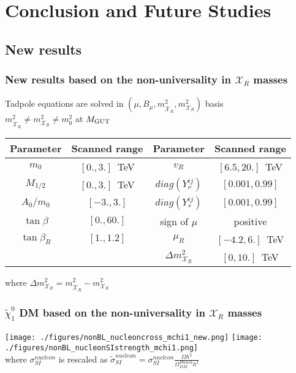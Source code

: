 \documentclass[hyperref={bookmarks=false},aspectratio=169]{beamer}
\def\singR{\mathcal{X}_{R}}
\def\singRbar{\mathcal{\overline{X}}_{R}}
\begin{document}

\section{Conclusion and Future Studies}

\subsection{New results}


\begin{frame}
\frametitle{New results based on the non-universality in $\singR$ masses}

\color{red}
\centering
Tadpole equations are solved in 
$(\mu, B_\mu, m_{\singRbar}^2, m_{\singR}^2 )$ basis \\
$m_{\singRbar}^2 \neq m_{\singR}^2 \neq m_0^2$ at $M_{\rm GUT}$ 
\pause
\begin{table}
	\color{black}
	\setlength\tabcolsep{7pt}
	\renewcommand{\arraystretch}{1.4}
	\begin{tabular}{c|c||c|c}
		Parameter      & Scanned range& Parameter      & Scanned range\\
		\hline
		$m_0$          & $[0., 3.]$~TeV   & $v_{R}$               & $[6.5, 20.]$~TeV\\
		$M_{1/2}$      & $[0., 3.]$~TeV   & $diag(Y_{\nu}^{ij})$  & $[0.001, 0.99]$\\
		$A_0/m_0$      & $[-3., 3.]$      & $diag(Y_{s}^{ij})$    & $[0.001, 0.99]$\\
		$\tan\beta$    & $[0., 60.]$      & {\rm sign of} $\mu$   & {\rm positive} \\
		$\tan\beta_R$  & $[1., 1.2]$    & \color{red} $\mu_R$ &  \color{red} $[-4.2, 6.]$~TeV \\ 
		  &   & \color{red} $\Delta m_{\singR}^2$ &  \color{red} $[0, 10.]$~TeV \\ 
	\end{tabular}
\end{table}

\color{red} where $\Delta m_{\singR}^2 = m_{\singRbar}^2 - m_{\singR}^2 $ 

\end{frame}



\begin{frame}
\frametitle{$\widetilde{\chi}_1^0$ DM based on the non-universality in $\singR$ masses}

\centering
\texttt{[image: ./figures/nonBL\_nucleoncross\_mchi1\_new.png]} 
\texttt{[image: ./figures/nonBL\_nucleonSIstrength\_mchi1.png]} \\

where $\sigma_{SI}^{nucleon}$ is rescaled as $\widetilde{\sigma}_{SI}^{nucleon} = \sigma_{SI}^{nucleon} \frac{\Omega h^2}{\Omega_{DM}^{Planck}h^2}$

\end{frame}
\end{document}
